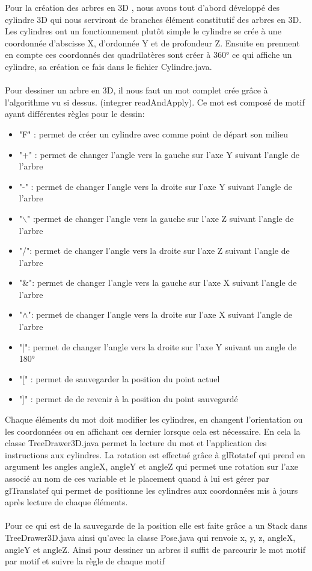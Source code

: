 \documentclass[a4paper,12pt]{article}
\begin{document}
Pour la création des arbres en 3D , nous avons tout d'abord développé des cylindre 3D qui nous serviront de branches élément constitutif des arbres en 3D. Les cylindres ont un fonctionnement plutôt simple le cylindre se crée à une coordonnée d'abscisse X, d'ordonnée  Y et de profondeur Z. Ensuite en prennent en compte ces coordonnés des quadrilatères sont créer à 360° ce qui affiche un cylindre, sa création ce fais dans le fichier Cylindre.java.  
\\\\
Pour dessiner un arbre en 3D, il nous faut un mot complet crée grâce à l'algorithme vu si dessus. (integrer readAndApply). Ce mot est composé de motif ayant différentes règles pour le dessin:\\
\begin{itemize}[label=\textbullet, font=\small]
    \item "F" : permet de créer un cylindre avec comme point de départ son milieu
    \item "+" : permet de changer l'angle vers la gauche sur l'axe Y suivant l'angle de l'arbre
    \item "-" : permet de changer l'angle vers la droite sur l'axe Y suivant l'angle de l'arbre
    \item "$\backslash$" :permet de changer l'angle vers la gauche sur l'axe Z suivant l'angle de l'arbre
    \item "/": permet de changer l'angle vers la droite sur l'axe Z suivant l'angle de l'arbre
    \item "\&": permet de changer l'angle vers la gauche sur l'axe X suivant l'angle de l'arbre
    \item "$\wedge$": permet de changer l'angle vers la droite sur l'axe X suivant l'angle de l'arbre
    \item "|": permet de changer l'angle vers la droite sur l'axe Y suivant un angle de 180°
    \item "[" : permet de sauvegarder la position du point actuel
    \item "]" : permet de de revenir à la position du point sauvegardé\\
\end{itemize}
Chaque éléments du mot doit modifier les cylindres, en changent l'orientation ou les coordonnées ou en affichant 
 ces dernier lorsque cela est nécessaire. En cela la classe TreeDrawer3D.java permet la lecture du mot et l'application des instructions aux cylindres. La rotation est effectué grâce à glRotatef qui prend en argument les angles angleX, angleY et angleZ qui permet une rotation sur l'axe associé au nom de ces variable et le placement quand à lui est gérer par glTranslatef qui permet de positionne les cylindres aux coordonnées mis à jours après lecture de chaque éléments.
 \\\\Pour ce qui est de la sauvegarde de la position elle est faite grâce a un Stack dans TreeDrawer3D.java ainsi qu'avec la classe Pose.java qui renvoie x, y, z, angleX, angleY et angleZ. 
Ainsi pour dessiner un arbres il suffit de parcourir le mot motif par motif et suivre la règle de chaque motif
\end{document}
